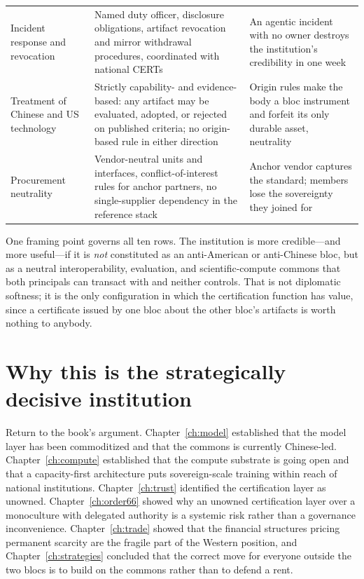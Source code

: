 \begin{table}[htbp]
\begin{tabular}{p{28mm}p{56mm}p{52mm}}
    \addlinespace
    Incident response and revocation & Named duty officer, disclosure obligations, artifact revocation and mirror withdrawal procedures, coordinated with national CERTs & An agentic incident with no owner destroys the institution's credibility in one week \\
    \addlinespace
    Treatment of Chinese and US technology & Strictly capability- and evidence-based: any artifact may be evaluated, adopted, or rejected on published criteria; no origin-based rule in either direction & Origin rules make the body a bloc instrument and forfeit its only durable asset, neutrality \\
    \addlinespace
    Procurement neutrality & Vendor-neutral units and interfaces, conflict-of-interest rules for anchor partners, no single-supplier dependency in the reference stack & Anchor vendor captures the standard; members lose the sovereignty they joined for \\
    \bottomrule
  \end{tabular}
\end{table}

One framing point governs all ten rows. The institution is more credible---and more useful---if it is \emph{not} constituted as an anti-American or anti-Chinese bloc, but as a neutral interoperability, evaluation, and scientific-compute commons that both principals can transact with and neither controls. That is not diplomatic softness; it is the only configuration in which the certification function has value, since a certificate issued by one bloc about the other bloc's artifacts is worth nothing to anybody.

\section{Why this is the strategically decisive institution}

Return to the book's argument. Chapter~\ref{ch:model} established that the model layer has been commoditized and that the commons is currently Chinese-led. Chapter~\ref{ch:compute} established that the compute substrate is going open and that a capacity-first architecture puts sovereign-scale training within reach of national institutions. Chapter~\ref{ch:trust} identified the certification layer as unowned. Chapter~\ref{ch:order66} showed why an unowned certification layer over a monoculture with delegated authority is a systemic risk rather than a governance inconvenience. Chapter~\ref{ch:trade} showed that the financial structures pricing permanent scarcity are the fragile part of the Western position, and Chapter~\ref{ch:strategies} concluded that the correct move for everyone outside the two blocs is to build on the commons rather than to defend a rent.


